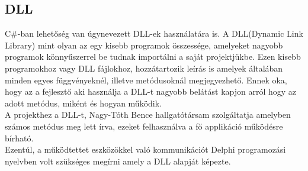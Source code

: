 \documentclass[tocnopagenum]{thesis-ekf}
\theoremstyle{definition}
\theoremstyle{remark}
\begin{document}
	\subsection*{DLL}
	C\#-ban lehetőség van úgynevezett DLL-ek használatára is. A DLL(Dynamic Link Library) mint olyan az egy kisebb programok összessége, amelyeket nagyobb programok könnyűszerrel be tudnak importálni a saját projektjükbe. Ezen kisebb programokhoz vagy DLL fájlokhoz, hozzátartozik leírás is amelyek általában minden egyes függvényeknél, illetve metódusoknál megjegyezhető. Ennek oka, hogy az a fejlesztő aki használja a DLL-t
	nagyobb belátást kapjon arról hogy az adott metódus, miként és hogyan működik.
	\\
	A projekthez a DLL-t, Nagy-Tóth Bence hallgatótársam szolgáltatja amelyben számos metódus meg lett írva, ezeket felhasználva a fő applikáció működésre bírható.
	\\
	Ezentúl, a működtettet eszközökkel való kommunikációt Delphi programozási nyelvben volt szükséges megírni amely a DLL alapját képezte. 
	\\
\end{document}
